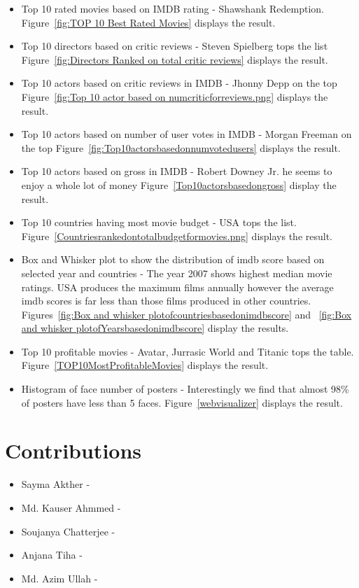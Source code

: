 \documentclass{article}%
\begin{document}
\begin{itemize}
\item Top 10 rated movies based on IMDB rating - Shawshank Redemption. Figure~\ref{fig:TOP 10 Best Rated Movies} displays the result.
\item Top 10 directors based on critic reviews - Steven Spielberg tops the list Figure~\ref{fig:Directors Ranked on total critic reviews} displays the result.
\item Top 10 actors based on critic reviews in IMDB - Jhonny Depp on the top Figure~\ref{fig:Top 10 actor based on numcriticforreviews.png} displays the result.
\item Top 10 actors based on number of user votes in IMDB - Morgan Freeman on the top Figure~\ref{fig:Top10actorsbasedonnumvotedusers} displays the result.
\item Top 10 actors based on gross in IMDB - Robert Downey Jr. he seems to enjoy a whole lot of money Figure~\ref{Top10actorsbasedongross} display the result.
\item Top 10 countries having most movie budget - USA tops the list. Figure~\ref{Countriesrankedontotalbudgetformovies.png} displays the result.
\item Box and Whisker plot to show the distribution of imdb score based on selected year and countries - The year 2007 shows highest median movie ratings. USA produces the maximum films annually however the average imdb scores is far less than those films produced in other countries. Figures~\ref{fig:Box and whisker plotofcountriesbasedonimdbscore} and ~\ref{fig:Box and whisker plotofYearsbasedonimdbscore} display the results.
\item Top 10 profitable movies - Avatar, Jurrasic World and Titanic tops the table. Figure~\ref{TOP10MostProfitableMovies} displays the result.
\item Histogram of face number of posters - Interestingly we find that almost 98\% of posters have less than 5 faces. Figure~\ref{webvisualizer} displays the result.
\end{itemize}

\section{Contributions}

\begin{itemize}
\item Sayma Akther - 
\item Md. Kauser Ahmmed - 
\item Soujanya Chatterjee - 
\item Anjana Tiha - 
\item Md. Azim Ullah -
\end{itemize}
\end{document}
